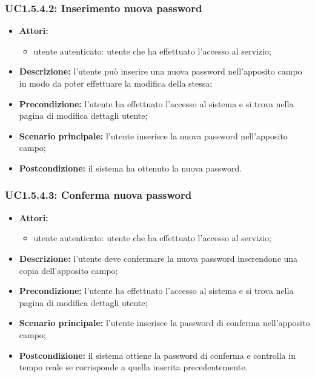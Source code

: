 \subsubsection{UC1.5.4.2: Inserimento nuova password}
\begin{itemize}
	\item \textbf{Attori:}
	\begin{itemize}
		\item utente autenticato: utente che ha effettuato l'accesso al servizio;
	\end{itemize}
	\item \textbf{Descrizione:} l'utente può inserire una nuova password nell'apposito campo in modo da poter effettuare la modifica della stessa;
	\item \textbf{Precondizione:} l'utente ha effettuato l'accesso al sistema e si trova nella pagina di modifica dettagli utente;
	\item \textbf{Scenario principale:} l'utente inserisce la nuova password nell'apposito campo;
	\item \textbf{Postcondizione:} il sistema ha ottenuto la nuova password.
\end{itemize}

\subsubsection{UC1.5.4.3: Conferma nuova password}
\begin{itemize}
	\item \textbf{Attori:}
	\begin{itemize}
		\item utente autenticato: utente che ha effettuato l'accesso al servizio;
	\end{itemize}
	\item \textbf{Descrizione:} l'utente deve confermare la nuova password inserendone una copia dell'apposito campo;
	\item \textbf{Precondizione:} l'utente ha effettuato l'accesso al sistema e si trova nella pagina di modifica dettagli utente;
	\item \textbf{Scenario principale:} l'utente inserisce la password di conferma nell'apposito campo;
	\item \textbf{Postcondizione:} il sistema ottiene la password di conferma e controlla in tempo reale se corrisponde a quella inserita precedentemente.
\end{itemize}

